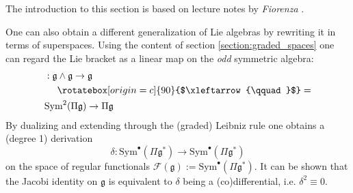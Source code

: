     The introduction to this section is based on lecture notes by \textit{Fiorenza} \cite{bv_formalism}.

    One can also obtain a different generalization of Lie algebras by rewriting it in terms of superspaces. Using the content of section \ref{section:graded_spaces} one can regard the Lie bracket as a linear map on the \textit{odd} symmetric algebra:
    \begin{align*}
        [\cdot,\cdot]&:\mathfrak{g}\wedge\mathfrak{g}\rightarrow\mathfrak{g}\\
        &\quad\ \rotatebox[origin=c]{90}{$\xleftarrow{\qquad}$}=\\
        &\text{Sym}^2(\Pi\mathfrak{g})\rightarrow\Pi\mathfrak{g}
    \end{align*}
    By dualizing and extending through the (graded) Leibniz rule one obtains a (degree 1) derivation \[\delta:\text{Sym}^\bullet(\Pi\mathfrak{g}^*)\rightarrow\text{Sym}^\bullet(\Pi\mathfrak{g}^*)\] on the space of regular functionals $\mathcal{F}(\mathfrak{g}):=\text{Sym}^\bullet(\Pi\mathfrak{g}^*)$. It can be shown that the Jacobi identity on $\mathfrak{g}$ is equivalent to $\delta$ being a (co)differential, i.e. $\delta^2\equiv0$.


